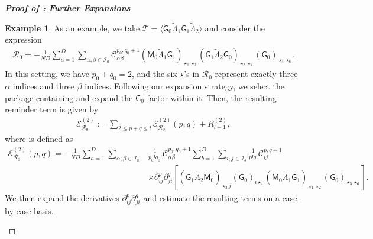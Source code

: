 \documentclass[10pt,reqno]{amsart}
\numberwithin{equation}{section}
\numberwithin{figure}{section}
\theoremstyle{plain} %
\theoremstyle{definition} %
\newtheorem{example}[theorem]{Example}
\newcommand{\wt}{\widetilde}
\newcommand{\cT}{\mathcal T}
\newcommand{\cI}{\mathcal{I}}
\newcommand{\cC}{\mathcal{C}}
\newcommand{\cR}{{\mathcal R}}
\newcommand{\cE}{{\mathcal{E}}}
\newcommand{\sG}{\mathsf G}
\newcommand{\sM}{\mathsf M}
\renewcommand{\leq}{\le}
\newcommand{\p}[1]{({#1})}
\newcommand{\pa}[1]{\left({#1}\right)}
\newcommand{\avg}[1]{\langle #1 \rangle}
\newcommand{\tLambda}{{\wt{\Lambda}}}
\newcommand{\bsum}[3]{\sum_{#1=1}^D\sum_{#2,#3\in \cI_{#1}}}
\newcommand{\iab}{\alpha\beta}
\newcommand{\tl}{\tLambda}
\numberwithin{equation}{section}
\begin{document}
\begin{proof}[\bf Proof of : Further Expansions]
    \begin{example}\label{example_estimate_reminder_reminder_terms}
As an example, we take $ \cT=\avg{\sG_0\tl_1\sG_1\tl_2}$ and consider the expression
        \begin{equation}\nonumber
            \begin{aligned}
                \cR_0=-\frac{1}{ND}\bsum{a}{\alpha}{\beta}\cC_{\iab}^{p_0,q_0+1}\p{\sM_0\tl_1\sG_1}_{\star_1\star_2}\p{\sG_1\tl_2\sG_0}_{\star_3\star_4}\p{\sG_0}_{\star_5\star_6}.
            \end{aligned}
        \end{equation}
In this setting, we have $p_0+q_0=2$, and the six $\star$'s in $\cR_0$ represent exactly three $\alpha$ indices and three $\beta$ indices. Following our expansion strategy, we select the package containing \smash{$\tl_2$} and expand the $\sG_0$ factor within it. Then, the resulting reminder term is given by
        \begin{equation}\nonumber
            \begin{aligned}
                \cE_{\cR_0}^{\pa{2}}:=\sum_{2\leq p+q\leq l}\cE_{\cR_0}^{\pa{2}}\pa{p,q}+R_{l+1}^{\pa{2}},
            \end{aligned}
        \end{equation}
        where \smash{$\cE_{\cR_0}^{\pa{2}}\pa{p,q}$} is defined as 
        \begin{equation}\nonumber
            \begin{aligned}
                \cE_{\cR_0}^{\pa{2}}\pa{p,q}
                =-\frac{1}{ND}\bsum{a}{\alpha}{\beta}&\frac{1}{p_0!q_0!}\cC_{\iab}^{p_0,q_0+1}\sum_{b=1}^D\sum_{i,j\in \cI_b}\frac{1}{p!q!}\cC_{ij}^{p,q+1}\\
                &\times\partial_{ij}^p\partial_{ji}^q\left[\p{\sG_{1}\tl_2\sM_0}_{\star_3j}\p{\sG_0}_{i\star_4}\p{\sM_0\tl_1\sG_1}_{\star_1\star_2}\p{\sG_0}_{\star_5\star_6}\right].
            \end{aligned}
        \end{equation}
        We then expand the derivatives $\partial_{ij}^p\partial_{ji}^q$ and estimate the resulting terms on a case-by-case basis.
        

\end{example}
\end{proof}
\end{document}
